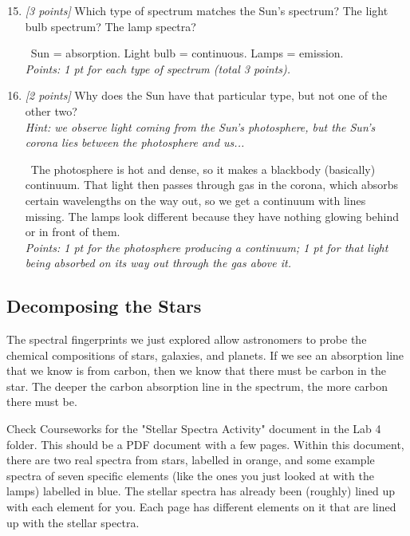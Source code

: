 \documentclass[11pt]{article}
\newcommand{\ans}[1]{%
  \par\smallskip\noindent{\color{blue!55!black}\textbf{Answer:}}\ #1\par\smallskip}
\begin{document}
\begin{enumerate}
    \setcounter{enumi}{14}

    \item \textit{[3 points]} Which type of spectrum matches the Sun's spectrum? The light bulb spectrum? The lamp spectra?

    \ans{Sun = absorption. Light bulb = continuous. Lamps = emission.
    \\[2pt]
    \emph{Points: 1 pt for each type of spectrum (total 3 points).}}

    \item \textit{[2 points]} Why does the Sun have that particular type, but not one of the other
    two? \\
    \textit{Hint: we observe light coming from the Sun's photosphere, but the
    Sun's corona lies between the photosphere and us...}

    \ans{The photosphere is hot and dense, so it makes a blackbody (basically) continuum. That light then passes through gas in the corona, which absorbs certain
    wavelengths on the way out, so we get a continuum with lines missing.
    The lamps look different because they have nothing glowing behind or in front of them.
    \\[2pt]
    \emph{Points: 1 pt for the photosphere producing a continuum; 1 pt for that
    light being absorbed on its way out through the gas above it.}}

\end{enumerate}

\subsection{Decomposing the Stars}
The spectral fingerprints we just explored allow astronomers to probe the chemical compositions of stars, galaxies, and planets. If we see an absorption line that we know is from carbon, then we know that there must be carbon in the star. The deeper the carbon absorption line in the spectrum, the more carbon there must be.

\medskip \noindent
Check Courseworks for the "Stellar Spectra Activity" document in the Lab 4 folder. This should be a PDF document with a few pages. Within this document, there are two real spectra from stars, labelled in orange, and some example spectra of seven specific elements (like the ones you just looked at with the lamps) labelled in blue. The stellar spectra has already been (roughly) lined up with each element for you. Each page has different elements on it that are lined up with the stellar spectra.
\end{document}
